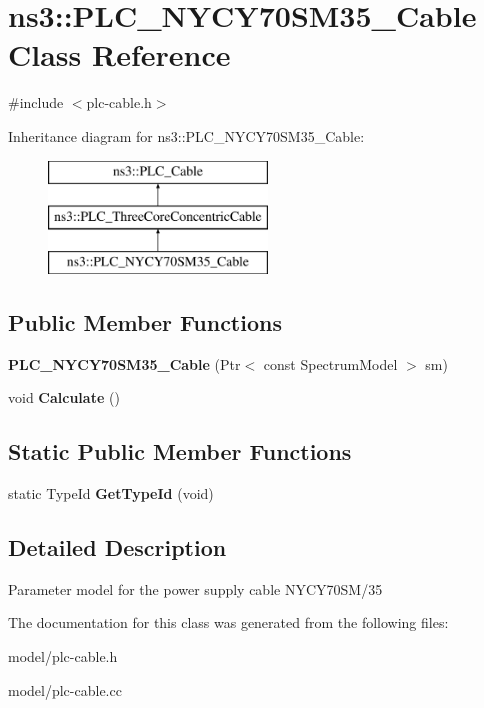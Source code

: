 \hypertarget{classns3_1_1PLC__NYCY70SM35__Cable}{\section{ns3\-:\-:\-P\-L\-C\-\_\-\-N\-Y\-C\-Y70\-S\-M35\-\_\-\-Cable \-Class \-Reference}
\label{classns3_1_1PLC__NYCY70SM35__Cable}
}


{\ttfamily \#include $<$plc-\/cable.\-h$>$}

\-Inheritance diagram for ns3\-:\-:\-P\-L\-C\-\_\-\-N\-Y\-C\-Y70\-S\-M35\-\_\-\-Cable\-:\begin{figure}[H]
\begin{center}
\leavevmode
\includegraphics[height=3.000000cm]{classns3_1_1PLC__NYCY70SM35__Cable}
\end{center}
\end{figure}
\subsection*{\-Public \-Member \-Functions}
\begin{DoxyCompactItemize}
\item 
\hypertarget{classns3_1_1PLC__NYCY70SM35__Cable_ab12266d3fe12224c6dc233907f946040}{{\bfseries \-P\-L\-C\-\_\-\-N\-Y\-C\-Y70\-S\-M35\-\_\-\-Cable} (\-Ptr$<$ const \-Spectrum\-Model $>$ sm)}\label{classns3_1_1PLC__NYCY70SM35__Cable_ab12266d3fe12224c6dc233907f946040}

\item 
\hypertarget{classns3_1_1PLC__NYCY70SM35__Cable_a04cf23915258c264964a0918c8f478c8}{void {\bfseries \-Calculate} ()}\label{classns3_1_1PLC__NYCY70SM35__Cable_a04cf23915258c264964a0918c8f478c8}

\end{DoxyCompactItemize}
\subsection*{\-Static \-Public \-Member \-Functions}
\begin{DoxyCompactItemize}
\item 
\hypertarget{classns3_1_1PLC__NYCY70SM35__Cable_adc117987437e652706f8686469607fec}{static \-Type\-Id {\bfseries \-Get\-Type\-Id} (void)}\label{classns3_1_1PLC__NYCY70SM35__Cable_adc117987437e652706f8686469607fec}

\end{DoxyCompactItemize}


\subsection{\-Detailed \-Description}
\-Parameter model for the power supply cable \-N\-Y\-C\-Y70\-S\-M/35 

\-The documentation for this class was generated from the following files\-:\begin{DoxyCompactItemize}
\item 
model/plc-\/cable.\-h\item 
model/plc-\/cable.\-cc\end{DoxyCompactItemize}
